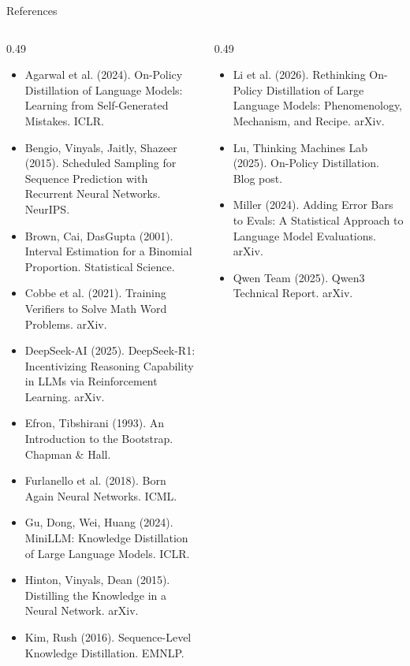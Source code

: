 \begin{frame}{References\hfill{}}
  \begin{columns}[T]
    \begin{column}{0.49\textwidth}
      \tiny
      \begin{itemize}\setlength{\itemsep}{1pt}
        \item Agarwal et al. (2024). On-Policy Distillation of Language Models: Learning from Self-Generated Mistakes. ICLR.
        \item Bengio, Vinyals, Jaitly, Shazeer (2015). Scheduled Sampling for Sequence Prediction with Recurrent Neural Networks. NeurIPS.
        \item Brown, Cai, DasGupta (2001). Interval Estimation for a Binomial Proportion. Statistical Science.
        \item Cobbe et al. (2021). Training Verifiers to Solve Math Word Problems. arXiv.
        \item DeepSeek-AI (2025). DeepSeek-R1: Incentivizing Reasoning Capability in LLMs via Reinforcement Learning. arXiv.
        \item Efron, Tibshirani (1993). An Introduction to the Bootstrap. Chapman \& Hall.
        \item Furlanello et al. (2018). Born Again Neural Networks. ICML.
        \item Gu, Dong, Wei, Huang (2024). MiniLLM: Knowledge Distillation of Large Language Models. ICLR.
        \item Hinton, Vinyals, Dean (2015). Distilling the Knowledge in a Neural Network. arXiv.
        \item Kim, Rush (2016). Sequence-Level Knowledge Distillation. EMNLP.
      \end{itemize}
    \end{column}
    \begin{column}{0.49\textwidth}
      \tiny
      \begin{itemize}\setlength{\itemsep}{1pt}
        \item Li et al. (2026). Rethinking On-Policy Distillation of Large Language Models: Phenomenology, Mechanism, and Recipe. arXiv.
        \item Lu, Thinking Machines Lab (2025). On-Policy Distillation. Blog post.
        \item Miller (2024). Adding Error Bars to Evals: A Statistical Approach to Language Model Evaluations. arXiv.
        \item Qwen Team (2025). Qwen3 Technical Report. arXiv.

\end{itemize}
\end{column}
\end{columns}
\end{frame}
